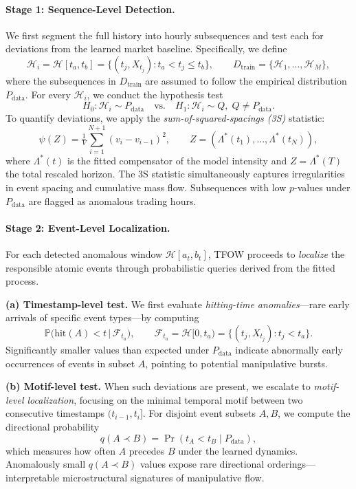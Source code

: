 \paragraph{Stage 1: Sequence-Level Detection.}
We first segment the full history into hourly subsequences and test each for deviations from the learned market baseline. Specifically, we define
\[
\mathcal{H}_i = \mathcal{H}[t_a, t_b] 
= \{(t_j, X_{t_j}) : t_a < t_j \le t_b\},
\qquad
D_{\text{train}} = \{\mathcal{H}_1, \dots, \mathcal{H}_M\},
\]
where the subsequences in $D_{\text{train}}$ are assumed to follow the empirical distribution $P_{\text{data}}$. For every $\mathcal{H}_i$, we conduct the hypothesis test
\[
H_0: \mathcal{H}_i \sim P_{\text{data}}
\quad \text{vs.} \quad
H_1: \mathcal{H}_i \sim Q, \; Q \neq P_{\text{data}}.
\]
To quantify deviations, we apply the \emph{sum-of-squared-spacings (3S)} statistic:
\[
\psi(Z) = \tfrac{1}{V} \sum_{i=1}^{N+1} (v_i - v_{i-1})^2,
\qquad
Z = (\Lambda^*(t_1), \ldots, \Lambda^*(t_N)),
\]
where $\Lambda^*(t)$ is the fitted compensator of the model intensity and $Z = \Lambda^*(T)$ the total rescaled horizon. 
The 3S statistic simultaneously captures irregularities in event spacing and cumulative mass flow. 
Subsequences with low $p$-values under $P_{\text{data}}$ are flagged as anomalous trading hours.

\paragraph{Stage 2: Event-Level Localization.}
For each detected anomalous window $\mathcal{H}[a_t,b_t]$, TFOW proceeds to \emph{localize} the responsible atomic events through probabilistic queries derived from the fitted process.

\textbf{(a) Timestamp-level test.}
We first evaluate \emph{hitting-time anomalies}---rare early arrivals of specific event types---by computing
\[
\mathbb{P}\big(\text{hit}(A) < t \,\big|\, \mathcal{F}_{t_a}\big),
\qquad
\mathcal{F}_{t_a} = \mathcal{H}[0, t_a) 
= \{(t_j, X_{t_j}) : t_j < t_a\}.
\]
Significantly smaller values than expected under $P_{\text{data}}$ indicate abnormally early occurrences of events in subset $A$, pointing to potential manipulative bursts.

\textbf{(b) Motif-level test.}
When such deviations are present, we escalate to \emph{motif-level localization}, focusing on the minimal temporal motif between two consecutive timestamps $(t_{i-1}, t_i]$. 
For disjoint event subsets $A, B$, we compute the directional probability
\[
q(A \prec B) = \Pr(t_A < t_B \mid P_{\text{data}}),
\]
which measures how often $A$ precedes $B$ under the learned dynamics. 
Anomalously small $q(A \prec B)$ values expose rare directional orderings---interpretable microstructural signatures of manipulative flow.

